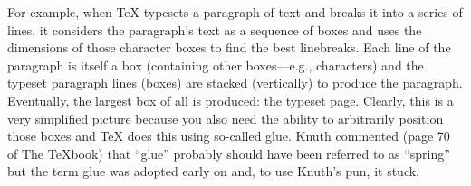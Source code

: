 
\nopagenumbers

\hsize 4in
For example, when \TeX{} typesets a paragraph of text and breaks it into a series of lines, it considers the paragraph's text as a sequence of boxes and uses the dimensions of those character boxes to find the best linebreaks. Each line of the paragraph is itself a box (containing other boxes---e.g., characters) and the typeset paragraph lines (boxes) are stacked (vertically) to produce the paragraph. Eventually, the largest box of all is produced: the typeset page. Clearly, this is a very simplified picture because you also need the ability to arbitrarily position those boxes and \TeX{} does this using so-called glue. Knuth commented (page 70 of The \TeX book) that ``glue'' probably should have been referred to as ``spring'' but the term glue was adopted early on and, to use Knuth's pun, it stuck.
\bye
